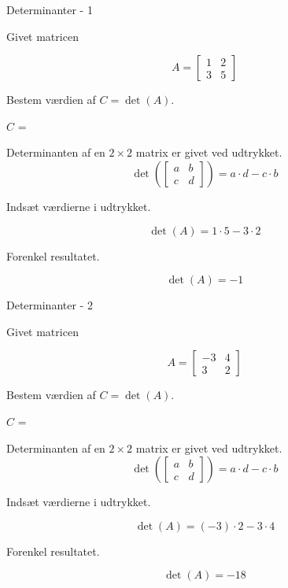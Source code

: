 \documentclass{article}
\begin{document}
\tableofcontents
\newpage

\begin{exercise}{Determinanter - 1}

Givet matricen

\[
A = \left[\begin{array}{rr}
1 & 2 \\
3 & 5
\end{array} \right]
\]

Bestem værdien af $C = \det(A)$.

$C$ = 

\hint
Determinanten af en $2 \times 2$ matrix er givet ved udtrykket.
\[
\det \left( \left[\begin{array}{rr}
a & b \\
c & d
\end{array} \right] \right) = a \cdot d - c \cdot b
\]

\hint
Indsæt værdierne i udtrykket.

\hint
\[
\det \left( A \right) = 1 \cdot 5 - 3 \cdot 2
\]

\hint
Forenkel resultatet.

\hint
\[
\det \left( A \right) = -1
\]

\end{exercise}


\begin{exercise}{Determinanter - 2}

Givet matricen

\[
A = \left[\begin{array}{rr}
-3 & 4 \\
3 & 2
\end{array} \right]
\]

Bestem værdien af $C = \det(A)$.

$C$ = 

\hint
Determinanten af en $2 \times 2$ matrix er givet ved udtrykket.
\[
\det \left( \left[\begin{array}{rr}
a & b \\
c & d
\end{array} \right] \right) = a \cdot d - c \cdot b
\]

\hint
Indsæt værdierne i udtrykket.

\hint
\[
\det \left( A \right) = (-3) \cdot 2 - 3 \cdot 4
\]

\hint
Forenkel resultatet.

\hint
\[
\det \left( A \right) = -18
\]

\end{exercise}
\end{document}

